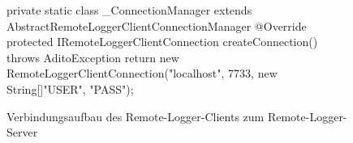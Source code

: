  \begin{wrapfigure}[8]{r}[0cm]{0.70\textwidth}
    \centering
    \vspace{-15px}
	\begin{spacing}{0.75}
		\begin{javacode}[firstnumber=146]
private static class _ConnectionManager 
  extends AbstractRemoteLoggerClientConnectionManager
{
  @Override
  protected IRemoteLoggerClientConnection createConnection() 
    throws AditoException
  {
    return new RemoteLoggerClientConnection("localhost", 
                          7733, new String[]{"USER", "PASS"});
  }
}\end{javacode}
	\end{spacing}
	\caption{Verbindungsaufbau des Remote-Logger-Clients zum Remote-Logger-Server}
	\label{fig:CODE_TestRemoteLogger-test_communication-ConnectionManager}
\end{wrapfigure}